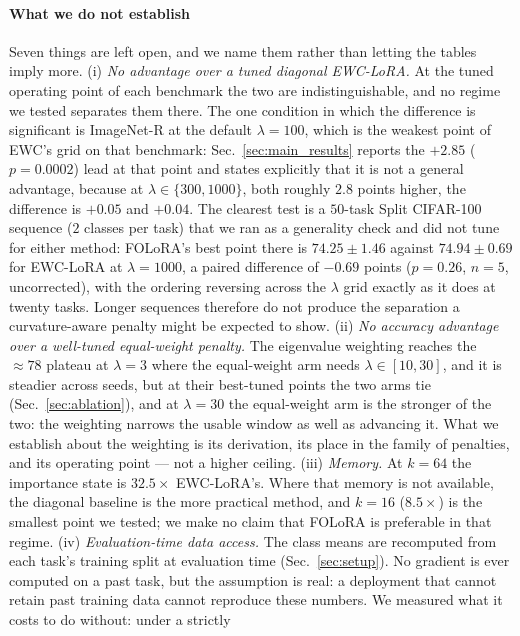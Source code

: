 \paragraph{What we do not establish}
Seven things are left open, and we name them rather than letting the tables imply more.
(i) \emph{No advantage over a tuned diagonal EWC-LoRA.} At the tuned operating point of each
benchmark the two are indistinguishable, and no regime we tested separates them there. The one
condition in which the difference is significant is ImageNet-R at the default
$\lambda{=}100$, which is the weakest point of EWC's grid on that benchmark: Sec.~\ref{sec:main_results}
reports the $+2.85$ ($p=0.0002$) lead at that point and states explicitly that it is not a
general advantage, because at $\lambda\in\{300,1000\}$, both roughly $2.8$ points higher, the
difference is $+0.05$ and $+0.04$. The clearest
test is a $50$-task Split CIFAR-100 sequence ($2$ classes per task) that we ran as a
generality check and did not tune for either method: FOLoRA's best point there is
$74.25\pm1.46$ against $74.94\pm0.69$ for EWC-LoRA at $\lambda{=}1000$, a paired difference
of $-0.69$ points ($p=0.26$, $n{=}5$, uncorrected), with the ordering reversing across the
$\lambda$ grid exactly as it does at twenty tasks. Longer sequences therefore do not produce
the separation a curvature-aware penalty might be expected to show.
(ii) \emph{No accuracy advantage over a well-tuned equal-weight penalty.} The eigenvalue
weighting reaches the $\approx78$ plateau at $\lambda=3$ where the equal-weight arm needs
$\lambda\in[10,30]$, and it is steadier across seeds, but at their best-tuned points the two
arms tie (Sec.~\ref{sec:ablation}), and at $\lambda=30$ the equal-weight arm is the stronger
of the two: the weighting narrows the usable window as well as advancing it. What we
establish about the weighting is its derivation,
its place in the family of penalties, and its operating point --- not a higher ceiling.
(iii) \emph{Memory.} At $k{=}64$ the importance state is $32.5\times$ EWC-LoRA's. Where that
memory is not available, the diagonal baseline is the more practical method, and $k{=}16$
($8.5\times$) is the smallest point we tested; we make no claim that FOLoRA is preferable in
that regime.
(iv) \emph{Evaluation-time data access.} The class means are recomputed from each task's
training split at evaluation time (Sec.~\ref{sec:setup}). No gradient is ever computed on a
past task, but the assumption is real: a deployment that cannot retain past training data
cannot reproduce these numbers. We measured what it costs to do without: under a strictly
